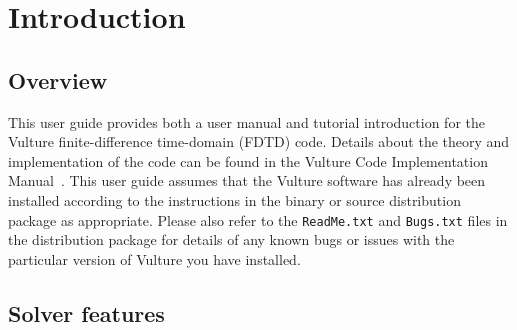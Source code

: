 \documentclass[onecolumn,a4paper]{article}
\numberwithin{equation}{section}
\begin{document}
\section{Introduction}         
%
%

\subsection{Overview}

This user guide provides both a user manual and tutorial introduction
for the Vulture finite-difference time-domain (FDTD) code. Details about the theory 
and implementation of the code can be found in the Vulture Code Implementation 
Manual~\cite{vultimp}. This user guide assumes that the Vulture software has already been 
installed according to the instructions in the binary or source distribution package 
as appropriate. Please also refer to the \texttt{ReadMe.txt} and \texttt{Bugs.txt} files in the 
distribution package for details of any known bugs or issues with the particular 
version of Vulture you have installed.

\subsection{Solver features}
\end{document}
